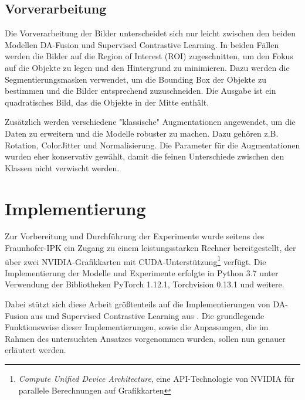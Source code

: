 \subsection{Vorverarbeitung} \label{sec:preprocessing}

Die Vorverarbeitung der Bilder unterscheidet sich nur leicht zwischen den beiden Modellen DA-Fusion und Supervised Contrastive Learning. In beiden Fällen werden die Bilder auf die Region of Interest (ROI) zugeschnitten, um den Fokus auf die Objekte zu legen und den Hintergrund zu minimieren. Dazu werden die Segmentierungsmasken verwendet, um die Bounding Box der Objekte zu bestimmen und die Bilder entsprechend zuzuschneiden. Die Ausgabe ist ein quadratisches Bild, das die Objekte in der Mitte enthält.

Zusätzlich werden verschiedene "klassische" Augmentationen angewendet, um die Daten zu erweitern und die Modelle robuster zu machen. Dazu gehören z.B. Rotation, ColorJitter und Normalisierung. Die Parameter für die Augmentationen wurden eher konservativ gewählt, damit die feinen Unterschiede zwischen den Klassen nicht verwischt werden.

\section{Implementierung} \label{sec:implementation}

Zur Vorbereitung und Durchführung der Experimente wurde seitens des Fraunhofer-IPK ein Zugang zu einem leistungsstarken Rechner bereitgestellt, der über zwei NVIDIA-Grafikkarten mit CUDA-Unterstützung\footnote{\textit{Compute Unified Device Architecture}, eine API-Technologie von NVIDIA für parallele Berechnungen auf Grafikkarten} verfügt. Die Implementierung der Modelle und Experimente erfolgte in Python 3.7 unter Verwendung der Bibliotheken PyTorch 1.12.1, Torchvision 0.13.1 und weitere.

Dabei stützt sich diese Arbeit größtenteils auf die Implementierungen von DA-Fusion aus \parencite{Trabucco2024dafusiongithub} und Supervised Contrastive Learning aus \parencite{Tian2023supcongithub}. Die grundlegende Funktionsweise dieser Implementierungen, sowie die Anpassungen, die im Rahmen des untersuchten Ansatzes vorgenommen wurden, sollen nun genauer erläutert werden.

